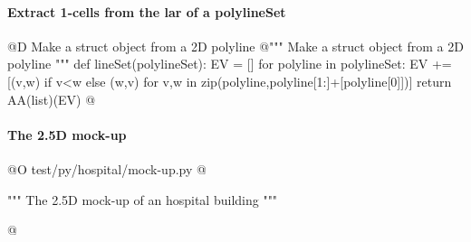 \documentclass[11pt,oneside]{article}    %
\begin{document}
\paragraph{Extract 1-cells from the lar of a polylineSet}
@D Make a struct object from a 2D polyline
@{""" Make a struct object from a 2D polyline """
def lineSet(polylineSet):
    EV = []
    for polyline in polylineSet:
        EV += [(v,w) if v<w else (w,v) for v,w in zip(polyline,polyline[1:]+[polyline[0]])]
    return AA(list)(EV)
@}
    

\paragraph{The 2.5D mock-up}
@O test/py/hospital/mock-up.py
@{""" The 2.5D mock-up of an hospital building """

@}




\end{document}

